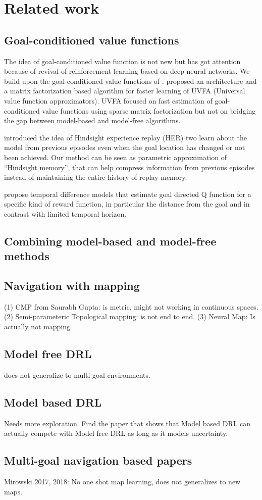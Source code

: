 
\section{Related work}
\subsection{Goal-conditioned value functions}
The idea of goal-conditioned value function is not new but has got attention because of revival of reinforcement learning based on deep neural networks.
We build upon the goal-conditioned value functions of \citet{schaul2015universal}.
\citet{schaul2015universal} proposed an architecture and a matrix factorization based algorithm for faster learning of UVFA (Universal value function approximators).
UVFA focused on fast estimation of goal-conditioned value functions using sparse
matrix factorization but not on bridging the gap between model-based and model-free
algorithms.


\citet{andrychowicz2016learning} introduced the idea of Hindsight experience replay (HER) two learn about the model from previous episodes even when the goal location has changed or not been achieved.
Our method can be seen as parametric approximation of ``Hindsight memory'',
that can help compress information from previous episodes instead of maintaining the
entire history of replay memory.

\cite{pong2018temporal} propose temporal difference models that estimate goal directed Q function for a specific kind of reward function, in particular the distance from the goal and in contrast with limited temporal horizon.

\subsection{Combining model-based and model-free methods}



\subsection{Navigation with mapping}
 (1) CMP from Saurabh Gupta: is metric, might not working in continuous spaces.
 (2) Semi-parameteric Topological mapping: is not end to end.
 (3) Neural Map: Is actually not mapping

\subsection{Model free DRL }
does not generalize to multi-goal environments.

\subsection{Model based DRL}
Needs more exploration.
Find the paper that shows that Model based DRL can actually compete with Model free DRL as long as it models uncertainty.

\subsection{Multi-goal navigation based papers}
Mirowski 2017, 2018: No one shot map learning, does not generalizes to new maps.
